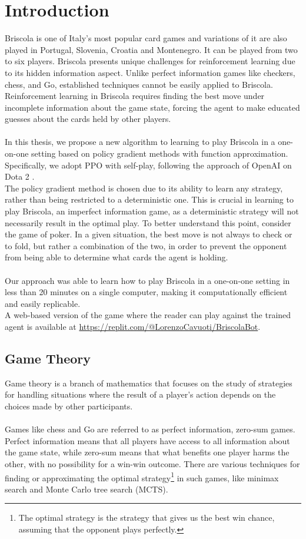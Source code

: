 \chapter{Introduction}
Briscola is one of Italy's most popular card games \cite{briscola-wikipedia} and variations of it are also played in Portugal, Slovenia, Croatia and Montenegro. It can be played from two to six players. Briscola presents unique challenges for reinforcement learning due to its hidden information aspect. Unlike perfect information games like checkers, chess, and Go, established techniques cannot be easily applied to Briscola. Reinforcement learning in Briscola requires finding the best move under incomplete information about the game state, forcing the agent to make educated guesses about the cards held by other players.\\\\
In this thesis, we propose a new algorithm to learning to play Briscola in a one-on-one setting based on policy gradient methods with function approximation. Specifically, we adopt PPO with self-play, following the approach of OpenAI on Dota 2 \cite{open-ai-five}.\\
The policy gradient method is chosen due to its ability to learn any strategy, rather than being restricted to a deterministic one. This is crucial in learning to play Briscola, an imperfect information game, as a deterministic strategy will not necessarily result in the optimal play. To better understand this point, consider the game of poker. In a given situation, the best move is not always to check or to fold, but rather a combination of the two, in order to prevent the opponent from being able to determine what cards the agent is holding.\\\\
Our approach was able to learn how to play Briscola in a one-on-one setting in less than 20 minutes on a single computer, making it computationally efficient and easily replicable.\\
A web-based version of the game where the reader can play against the trained agent is available at \url{https://replit.com/@LorenzoCavuoti/BriscolaBot}.

\section{Game Theory}
Game theory is a branch of mathematics that focuses on the study of strategies for handling situations where the result of a player's action depends on the choices made by other participants.\\\\
Games like chess and Go are referred to as perfect information, zero-sum games. Perfect information means that all players have access to all information about the game state, while zero-sum means that what benefits one player harms the other, with no possibility for a win-win outcome. There are various techniques for finding or approximating the optimal strategy\footnote{The optimal strategy is the strategy that gives us the best win chance, assuming that the opponent plays perfectly.} in such games, like minimax search and Monte Carlo tree search (MCTS).

